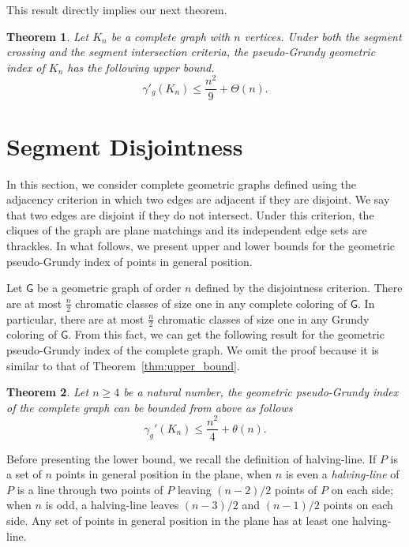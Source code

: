 \documentclass[11pt]{article}
\newtheorem{theorem}{Theorem}
\begin{document}
This result directly implies our next theorem.
\begin{theorem} 

Let $K_n$ be a complete graph with $n$ vertices. Under both the segment crossing and the segment intersection criteria, the pseudo-Grundy geometric index of $K_n$ has the following upper bound.
$$\gamma'_g(K_n)\leq \frac{n^2}{9}+\Theta(n).$$
\end{theorem}




\section{Segment Disjointness} \label{sec:disjoint}

In this section, we consider complete geometric graphs defined using the adjacency criterion in which two edges are adjacent if they are disjoint. We say that two edges are disjoint if they do not intersect. Under this criterion, the cliques of the graph are plane matchings and its independent edge sets are thrackles. In what follows, we present upper and lower bounds for the geometric pseudo-Grundy index of points in general position. 



Let $\mathsf{G}$ be a geometric graph of order $n$ defined by the disjointness criterion. There are at most $\frac{n}{2}$ chromatic classes of size one in any complete coloring of $\mathsf{G}$. In particular, there are at most $\frac{n}{2}$ chromatic classes of size one in any Grundy coloring of $\mathsf{G}$. From this fact, we can get the following result for the geometric pseudo-Grundy index of the complete graph. We omit the proof because it is similar to that of Theorem~\ref{thm:upper_bound}.


\begin{theorem}
Let $n\geq 4$ be a natural number, the geometric pseudo-Grundy index of the complete graph can be bounded from above as follows
\[\gamma_g'(K_n)\leq \frac{n^2}{4}+\theta(n).\]
\end{theorem}

Before presenting the lower bound, we recall the definition of halving-line. If $P$ is a set of $n$ points in general position in the plane, when $n$ is even a \emph{halving-line} of $P$ is a line through two points of $P$ leaving $(n-2)/2$ points of $P$ on each side; when $n$ is odd, a halving-line leaves $(n-3)/2$ and $(n-1)/2$ points on each side. Any set of points in general position in the plane has at least one halving-line.
\end{document}
